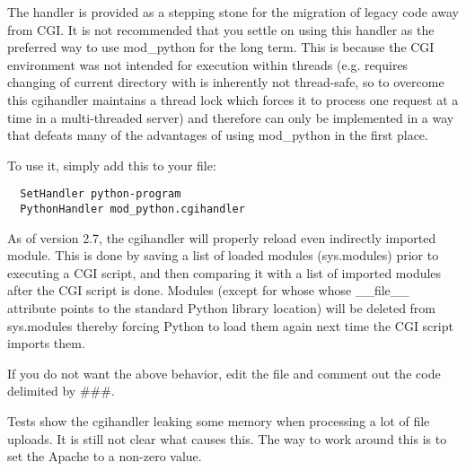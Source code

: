 The handler is provided as a stepping stone for the migration of
legacy code away from CGI. It is not recommended that you settle on
using this handler as the preferred way to use mod_python for the long
term. This is because the CGI environment was not intended for
execution within threads (e.g. requires changing of current directory
with is inherently not thread-safe, so to overcome this cgihandler
maintains a thread lock which forces it to process one request at a
time in a multi-threaded server) and therefore can only be implemented
in a way that defeats many of the advantages of using mod_python in
the first place.

To use it, simply add this to your  file: 

\begin{verbatim}
  SetHandler python-program
  PythonHandler mod_python.cgihandler
\end{verbatim}

As of version 2.7, the cgihandler will properly reload even indirectly
imported module. This is done by saving a list of loaded modules
(sys.modules) prior to executing a CGI script, and then comparing it
with a list of imported modules after the CGI script is done.  Modules
(except for whose whose __file__ attribute points to the standard
Python library location) will be deleted from sys.modules thereby
forcing Python to load them again next time the CGI script imports
them.

If you do not want the above behavior, edit the 
file and comment out the code delimited by \#\#\#.

Tests show the cgihandler leaking some memory when processing a lot of
file uploads. It is still not clear what causes this. The way to work
around this is to set the Apache  to a non-zero
value.


